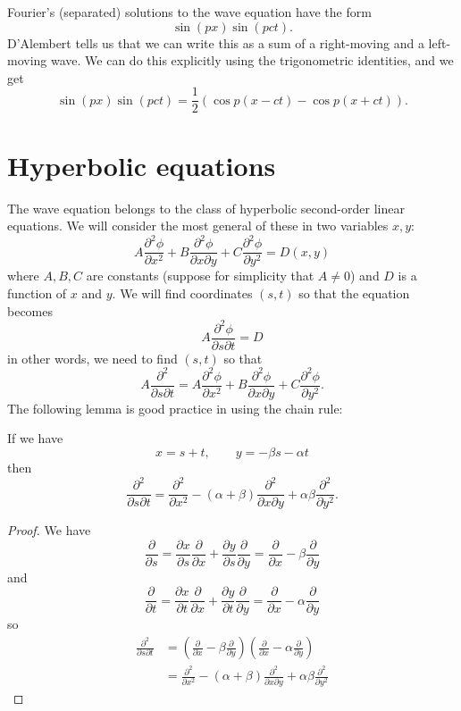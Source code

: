 \begin{rmk}
Fourier's (separated) solutions to the wave equation have the form
\[\sin(px)\sin(pct).\]
D'Alembert tells us that we can write this as a sum of a right-moving and a left-moving wave. We can do this explicitly using the trigonometric identities, and we get
\[\sin(px)\sin(pct)=\frac{1}{2}\left(\cos p(x-ct)-\cos p(x+ct)\right).\]
\end{rmk}

\section{Hyperbolic equations}

The wave equation belongs to the class of hyperbolic second-order linear equations. We will consider the most general of these in two variables $x,y$:
\[A\frac{\partial^2\phi}{\partial x^2}+B\frac{\partial^2\phi}{\partial x\partial y}+C\frac{\partial^2\phi}{\partial y^2}=D(x,y)\]
where $A,B,C$ are constants (suppose for simplicity that $A\neq 0$) and $D$ is a function of $x$ and $y$. We will find coordinates $(s,t)$ so that the equation becomes
\[A\frac{\partial^2\phi}{\partial s\partial t}=D\]
in other words, we need to find $(s,t)$ so that
\[A\frac{\partial^2}{\partial s\partial t}=A\frac{\partial^2\phi}{\partial x^2}+B\frac{\partial^2\phi}{\partial x\partial y}+C\frac{\partial^2\phi}{\partial y^2}.\]
The following lemma is good practice in using the chain rule:
\begin{lma}
If we have
\[x=s+t,\qquad y=-\beta s-\alpha t\]
then
\[\frac{\partial^2}{\partial s\partial t}=\frac{\partial^2}{\partial x^2}-(\alpha+\beta)\frac{\partial^2}{\partial x\partial y}+\alpha\beta\frac{\partial^2}{\partial y^2}.\]
\end{lma}
\begin{proof}
We have
\[\frac{\partial}{\partial s}=\frac{\partial x}{\partial s}\frac{\partial}{\partial x}+\frac{\partial y}{\partial s}\frac{\partial}{\partial y}=\frac{\partial}{\partial x}-\beta\frac{\partial}{\partial y}\]
and
\[\frac{\partial}{\partial t}=\frac{\partial x}{\partial t}\frac{\partial}{\partial x}+\frac{\partial y}{\partial t}\frac{\partial}{\partial y}=\frac{\partial}{\partial x}-\alpha\frac{\partial}{\partial y}\]
so
\begin{align*}
\frac{\partial^2}{\partial s\partial t}&=\left(\frac{\partial}{\partial x}-\beta\frac{\partial}{\partial y}\right)\left(\frac{\partial}{\partial x}-\alpha\frac{\partial}{\partial y}\right)\\
&=\frac{\partial^2}{\partial x^2}-(\alpha+\beta)\frac{\partial^2}{\partial x\partial y}+\alpha\beta\frac{\partial^2}{\partial y^2}
\end{align*}
\end{proof}

